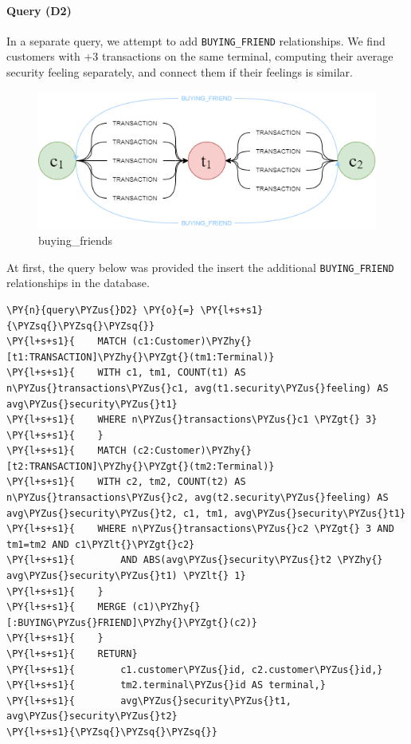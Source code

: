     

    \hypertarget{query-d2}{%
\paragraph{Query (D2)}\label{query-d2}}

    In a separate query, we attempt to add \texttt{BUYING\_FRIEND}
relationships. We find customers with +3 transactions on the same
terminal, computing their average security feeling separately, and
connect them if their feelings is similar.

\begin{figure}
\centering
\includegraphics{images/buying-friends-diagram.png}
\caption{buying\_friends}
\end{figure}

At first, the query below was provided the insert the additional
\texttt{BUYING\_FRIEND} relationships in the database.

    \begin{tcolorbox}[breakable, size=fbox, boxrule=1pt, pad at break*=1mm,colback=cellbackground, colframe=cellborder]
\begin{Verbatim}[commandchars=\\\{\}]
\PY{n}{query\PYZus{}D2} \PY{o}{=} \PY{l+s+s1}{\PYZsq{}\PYZsq{}\PYZsq{}}
\PY{l+s+s1}{    MATCH (c1:Customer)\PYZhy{}[t1:TRANSACTION]\PYZhy{}\PYZgt{}(tm1:Terminal)}
\PY{l+s+s1}{    WITH c1, tm1, COUNT(t1) AS n\PYZus{}transactions\PYZus{}c1, avg(t1.security\PYZus{}feeling) AS avg\PYZus{}security\PYZus{}t1}
\PY{l+s+s1}{    WHERE n\PYZus{}transactions\PYZus{}c1 \PYZgt{} 3}
\PY{l+s+s1}{    }
\PY{l+s+s1}{    MATCH (c2:Customer)\PYZhy{}[t2:TRANSACTION]\PYZhy{}\PYZgt{}(tm2:Terminal)}
\PY{l+s+s1}{    WITH c2, tm2, COUNT(t2) AS n\PYZus{}transactions\PYZus{}c2, avg(t2.security\PYZus{}feeling) AS avg\PYZus{}security\PYZus{}t2, c1, tm1, avg\PYZus{}security\PYZus{}t1}
\PY{l+s+s1}{    WHERE n\PYZus{}transactions\PYZus{}c2 \PYZgt{} 3 AND tm1=tm2 AND c1\PYZlt{}\PYZgt{}c2}
\PY{l+s+s1}{        AND ABS(avg\PYZus{}security\PYZus{}t2 \PYZhy{} avg\PYZus{}security\PYZus{}t1) \PYZlt{} 1}
\PY{l+s+s1}{    }
\PY{l+s+s1}{    MERGE (c1)\PYZhy{}[:BUYING\PYZus{}FRIEND]\PYZhy{}\PYZgt{}(c2)}
\PY{l+s+s1}{    }
\PY{l+s+s1}{    RETURN}
\PY{l+s+s1}{        c1.customer\PYZus{}id, c2.customer\PYZus{}id,}
\PY{l+s+s1}{        tm2.terminal\PYZus{}id AS terminal,}
\PY{l+s+s1}{        avg\PYZus{}security\PYZus{}t1, avg\PYZus{}security\PYZus{}t2}
\PY{l+s+s1}{\PYZsq{}\PYZsq{}\PYZsq{}}
\end{Verbatim}
\end{tcolorbox}

